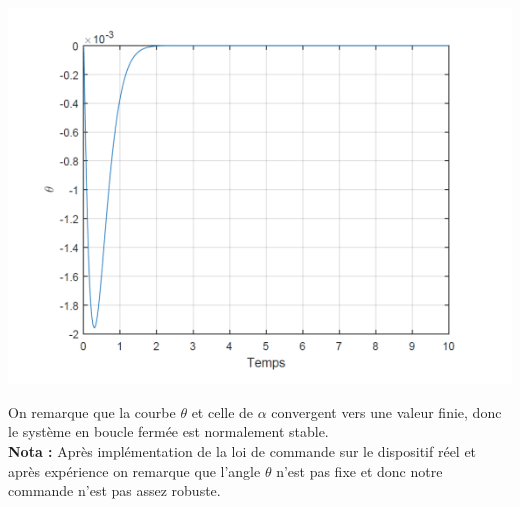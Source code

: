 \documentclass[12pt, a4paper, openany]{report}
\begin{document}
\begin{center}
\includegraphics[scale=0.7]{figue1.png}
\label{fig9}
\end{center}
On remarque que la courbe $\theta$ et celle de $\alpha$ convergent vers une valeur finie, donc le système en boucle fermée est normalement stable.\\

\textbf{Nota : } Après implémentation de la loi de commande sur le dispositif réel et après expérience on remarque que l'angle $\theta$ n'est pas fixe et donc notre commande n'est pas assez robuste.
  


     
\end{document}
